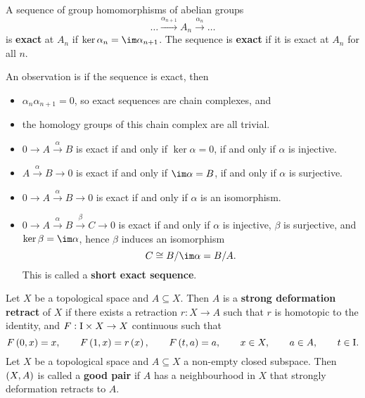 \begin{definition*}
A sequence of group homomorphisms of abelian groups
$$ \dots \xrightarrow{\alpha_{n + 1}} A_n \xrightarrow{\alpha_n} \dots $$
is \textbf{exact} at $ A_n $ if $ \ker \alpha_n = \im \alpha_{n + 1} $. The sequence is \textbf{exact} if it is exact at $ A_n $ for all $ n $.
\end{definition*}

An observation is if the sequence is exact, then
\begin{itemize}
\item $ \alpha_n\alpha_{n + 1} = 0 $, so exact sequences are chain complexes, and
\item the homology groups of this chain complex are all trivial.
\end{itemize}

\begin{example*}
\hfill
\begin{itemize}
\item $ 0 \to A \xrightarrow{\alpha} B $ is exact if and only if $ \ker \alpha = 0 $, if and only if $ \alpha $ is injective.
\item $ A \xrightarrow{\alpha} B \to 0 $ is exact if and only if $ \im \alpha = B $, if and only if $ \alpha $ is surjective.
\item $ 0 \to A \xrightarrow{\alpha} B \to 0 $ is exact if and only if $ \alpha $ is an isomorphism.
\item $ 0 \to A \xrightarrow{\alpha} B \xrightarrow{\beta} C \to 0 $ is exact if and only if $ \alpha $ is injective, $ \beta $ is surjective, and $ \ker \beta = \im \alpha $, hence $ \beta $ induces an isomorphism
$$ C \cong B / \im \alpha = B / A. $$
This is called a \textbf{short exact sequence}.
\end{itemize}
\end{example*}

\begin{definition*}
Let $ X $ be a topological space and $ A \subseteq X $. Then $ A $ is a \textbf{strong deformation retract} of $ X $ if there exists a retraction $ r : X \to A $ such that $ r $ is homotopic to the identity, and $ F : \mathrm{I} \times X \to X $ continuous such that
$$ F\br{0, x} = x, \qquad F\br{1, x} = r\br{x}, \qquad F\br{t, a} = a, \qquad x \in X, \qquad a \in A, \qquad t \in \I. $$
Let $ X $ be a topological space and $ A \subseteq X $ a non-empty closed subspace. Then $ \br{X, A} $ is called a \textbf{good pair} if $ A $ has a neighbourhood in $ X $ that strongly deformation retracts to $ A $.
\end{definition*}

